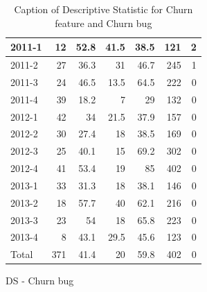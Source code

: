 \documentclass[UKenglish]{ifimaster}  %
\begin{document}
\begin{appendices}
\begin{table}[!htbp]
\begin{adjustwidth}{-2.5cm}{}
\begin{subfigure}[b]{0.7\textwidth}
{\begin{tabular}{ | l | r | r | r | r | r | r | }
 2011-1  & 12 & 52.8 & 41.5 & 38.5 & 121 & 2 \\ \hline
 2011-2  & 27 & 36.3 & 31 & 46.7 & 245 & 1 \\ \hline
 2011-3  & 24 & 46.5 & 13.5 & 64.5 & 222 & 0\\ \hline
 2011-4  & 39 & 18.2 & 7 & 29 & 132 & 0\\ \hline
 2012-1  & 42 & 34 & 21.5 & 37.9 & 157 & 0\\ \hline
 2012-2  & 30 & 27.4 & 18 & 38.5 & 169 & 0\\ \hline
 2012-3  & 25 & 40.1 & 15 & 69.2 & 302 & 0\\ \hline
 2012-4  & 41 & 53.4 & 19 & 85 & 402 & 0\\ \hline
 2013-1  & 33 & 31.3 & 18 & 38.1 & 146 & 0\\ \hline
 2013-2  & 18 & 57.7 & 40 & 62.1 & 216 & 0\\ \hline
 2013-3  & 23 & 54 & 18 & 65.8 & 223 & 0\\ \hline
 2013-4  & 8 & 43.1 & 29.5 & 45.6 & 123 & 0\\ \hline
 Total  & 371 & 41.4 & 20 & 59.8 & 402 & 0\\ \hline
\end{tabular}
}
\caption{DS - Churn bug}
 \label{DS:CB:3}
\end{subfigure}
\end{adjustwidth}
\caption[Optional caption for list of figures]{Caption of Descriptive Statistic for Churn feature and Churn bug}
\label{DS:3:4}
\end{table}





\end{appendices}
\end{document}
